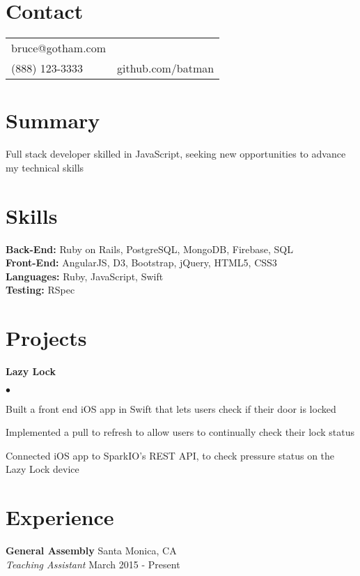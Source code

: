 \documentclass[margin,line]{res}
\newenvironment{list2}{
  \begin{list}{$\bullet$}{%
      \setlength{\itemsep}{0in}
      \setlength{\parsep}{0in} \setlength{\parskip}{0in}
      \setlength{\topsep}{0in} \setlength{\partopsep}{0in}
      \setlength{\leftmargin}{0.2in}}}{\end{list}}
\begin{document}

\begin{resume}
\section{\sc Contact}
\begin{tabular}{@{}p{2in}p{4in}}
bruce@gotham.com \\
(888) 123-3333 & github.com/batman \\

\end{tabular}

\section{\sc Summary}
 Full stack developer skilled in JavaScript, seeking new opportunities to advance my technical skills

\section{\sc Skills}
{\bf Back-End:} Ruby on Rails, PostgreSQL, MongoDB, Firebase, SQL \\
{\bf Front-End:} AngularJS, D3, Bootstrap, jQuery, HTML5, CSS3 \\
{\bf Languages:} Ruby, JavaScript, Swift \\
{\bf Testing:} RSpec

\section{\sc Projects}
{\bf Lazy Lock}
\vspace{0.2cm}

\begin{list2}
\item Built a front end iOS app in Swift that lets users check if their door is locked
\item Implemented a pull to refresh to allow users to continually check their lock status
\item Connected iOS app to SparkIO's REST API, to check pressure status on the Lazy Lock device
\end{list2}

\section{\sc Experience}
{\bf General Assembly} \hfill{Santa Monica, CA} \\
{\em Teaching Assistant} \hfill{March 2015 - Present} \\
\vspace{-0.3cm}


\end{resume}
\end{document}
